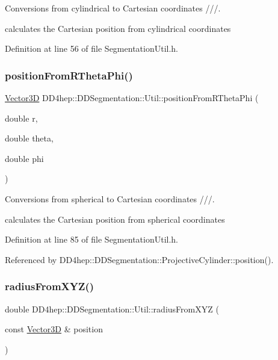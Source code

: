 Conversions from cylindrical to Cartesian coordinates ///. 

calculates the Cartesian position from cylindrical coordinates 

Definition at line 56 of file Segmentation\+Util.\+h.

\hypertarget{namespace_d_d4hep_1_1_d_d_segmentation_1_1_util_a9da66f5c45a3396609860916f296ae0c}{}\label{namespace_d_d4hep_1_1_d_d_segmentation_1_1_util_a9da66f5c45a3396609860916f296ae0c} 
\subsubsection{\texorpdfstring{position\+From\+R\+Theta\+Phi()}{positionFromRThetaPhi()}}
{\footnotesize\ttfamily \hyperlink{struct_d_d4hep_1_1_d_d_segmentation_1_1_vector3_d}{Vector3D} D\+D4hep\+::\+D\+D\+Segmentation\+::\+Util\+::position\+From\+R\+Theta\+Phi (\begin{DoxyParamCaption}\item[{double}]{r,  }\item[{double}]{theta,  }\item[{double}]{phi }\end{DoxyParamCaption})}



Conversions from spherical to Cartesian coordinates ///. 

calculates the Cartesian position from spherical coordinates 

Definition at line 85 of file Segmentation\+Util.\+h.



Referenced by D\+D4hep\+::\+D\+D\+Segmentation\+::\+Projective\+Cylinder\+::position().

\hypertarget{namespace_d_d4hep_1_1_d_d_segmentation_1_1_util_a27d8eaa8e3001150da1b4cf657eecbb0}{}\label{namespace_d_d4hep_1_1_d_d_segmentation_1_1_util_a27d8eaa8e3001150da1b4cf657eecbb0} 
\subsubsection{\texorpdfstring{radius\+From\+X\+Y\+Z()}{radiusFromXYZ()}}
{\footnotesize\ttfamily double D\+D4hep\+::\+D\+D\+Segmentation\+::\+Util\+::radius\+From\+X\+YZ (\begin{DoxyParamCaption}\item[{const \hyperlink{struct_d_d4hep_1_1_d_d_segmentation_1_1_vector3_d}{Vector3D} \&}]{position }\end{DoxyParamCaption})}



